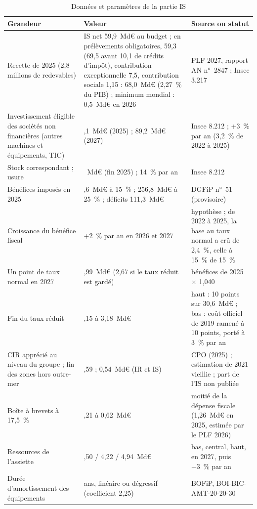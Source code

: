 \begin{table}[!htbp]\centering\scriptsize
\caption{Données et paramètres de la partie IS}\label{tab:is_calibrage}
\begin{tabularx}{\linewidth}{@{}>{\raggedright\arraybackslash}p{4.6cm}>{\raggedright\arraybackslash}p{3.3cm}>{\raggedright\arraybackslash}X@{}}
\toprule
Grandeur & Valeur & Source ou statut \\
\midrule
Recette de 2025 (2,8 millions de redevables) & IS net 59,9~Md€ au budget ; en prélèvements obligatoires, 59,3 (69,5
avant 10,1 de crédits d'impôt), contribution exceptionnelle 7,5, contribution sociale 1,15 : 68,0~Md€ (2,27~\% du PIB) ;
minimum mondial : 0,5~Md€ en 2026 & PLF 2027, rapport AN n°~2847 ; Insee 3.217 \\
Investissement éligible des sociétés non financières (autres machines et équipements, TIC) & 84,1~Md€ (2025) ; 89,2~Md€
(2027) & Insee 8.212 ; +3~\% par an (3,2~\% de 2022 à 2025) \\
Stock correspondant ; usure & 541~Md€ (fin 2025) ; 14~\% par an & Insee 8.212 \\
Bénéfices imposés en 2025 & 30,6~Md€ à 15~\% ; 256,8~Md€ à 25~\% ; déficits 111,3~Md€ & DGFiP n°~51 (provisoire) \\
Croissance du bénéfice fiscal & +2~\% par an en 2026 et 2027 & hypothèse ; de 2022 à 2025, la base au taux normal a crû
de 2,4~\%, celle à 15~\% de 15~\% \\
Un point de taux normal en 2027 & 2,99~Md€ (2,67 si le taux réduit est gardé) & bénéfices de 2025 $\times$ 1,040 \\
Fin du taux réduit & 2,15 à 3,18~Md€ & haut : 10 points sur 30,6~Md€ ; bas : coût officiel de 2019 ramené à 10 points,
porté à 3~\% par an \\
CIR apprécié au niveau du groupe ; fin des zones hors outre-mer & 0,59 ; 0,54~Md€ (IR et IS) & CPO (2025) ; estimation
de 2021 vieillie ; part de l'IS non publiée \\
Boîte à brevets à 17,5~\% & 0,21 à 0,62~Md€ & moitié de la dépense fiscale (1,26~Md€ en 2025, estimée par le PLF 2026) \\
Ressources de l'assiette & 3,50 / 4,22 / 4,94~Md€ & bas, central, haut, en 2027, puis +3~\% par an \\
Durée d'amortissement des équipements & 7 ans, linéaire ou dégressif (coefficient 2,25) & BOFiP, BOI-BIC-AMT-20-20-30 \\
\bottomrule
\end{tabularx}
\end{table}

